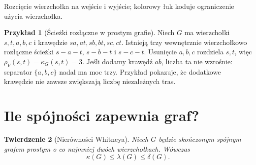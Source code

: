\documentclass[11pt,a4paper]{report}
\numberwithin{equation}{section}
\theoremstyle{plain}
\newtheorem{twierdzenie}{Twierdzenie}[section]
\theoremstyle{definition}
\newtheorem{przyklad}[twierdzenie]{Przykład}
\theoremstyle{remark}
\begin{document}
\begin{center}

{\footnotesize Rozcięcie wierzchołka na wejście i wyjście;
kolorowy łuk koduje ograniczenie użycia wierzchołka.}
\end{center}

\begin{przyklad}[Ścieżki rozłączne w prostym grafie]
Niech $G$ ma wierzchołki $s,t,a,b,c$ i krawędzie
$sa,at,sb,bt,sc,ct$. Istnieją trzy wewnętrznie
wierzchołkowo rozłączne ścieżki $s\! -\!a\! -\! t$,
$s\! -\! b\! -\! t$ i $s\! -\! c\! -\! t$.
Usunięcie $a,b,c$ rozdziela $s,t$, więc
$\rho_V(s,t)=\kappa_G(s,t)=3$.
Jeśli dodamy krawędź $ab$, liczba ta nie wzrośnie:
separator $\{a,b,c\}$ nadal ma moc trzy.
Przykład pokazuje, że dodatkowe krawędzie nie zawsze
zwiększają liczbę niezależnych tras.
\end{przyklad}

\begin{center}
\end{center}

\section{Ile spójności zapewnia graf?}
\label{sec:tg-whitney}

\begin{twierdzenie}[Nierówności Whitneya]
\label{thm:tg-whitney}
Niech $G$ będzie skończonym spójnym grafem prostym
o co najmniej dwóch wierzchołkach. Wówczas
\[
\kappa(G)\le\lambda(G)\le\delta(G).
\]
\end{twierdzenie}
\end{document}
